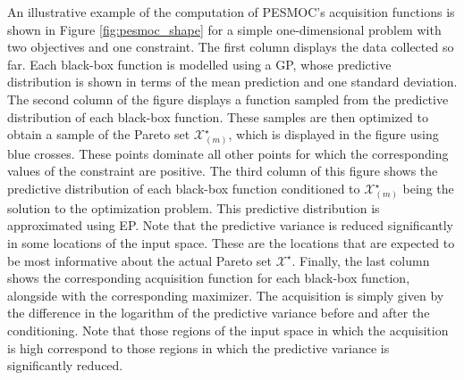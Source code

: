 An illustrative example of the computation of PESMOC's acquisition functions is shown in Figure
\ref{fig:pesmoc_shape} for a simple one-dimensional problem with two objectives and one constraint.
The first column displays the data collected so far. Each black-box function is
modelled using a GP, whose predictive distribution is shown in terms of the mean
prediction and one standard deviation. The second column of the figure displays a function sampled
from the predictive distribution of each black-box function. These samples are then optimized to obtain a sample
of the Pareto set $\mathcal{X}^\star_{(m)}$, which is displayed in the figure using blue crosses.
These points dominate all other points for which the corresponding values
of the constraint are positive. The third column of this figure shows the predictive distribution
of each black-box function conditioned to $\mathcal{X}^\star_{(m)}$ being the solution to the optimization
problem. This predictive distribution is approximated using EP. Note that the predictive variance
is reduced significantly in some locations of the input space. These are the locations that are expected to be most
informative about the actual Pareto set $\mathcal{X}^\star$. Finally, the last column shows the corresponding
acquisition function for each black-box function, alongside with the corresponding maximizer.
The acquisition is simply given by the difference in the logarithm of the predictive variance before and
after the conditioning. Note that those regions of the input space in which the acquisition is high correspond to those regions in which the predictive variance is significantly reduced.

